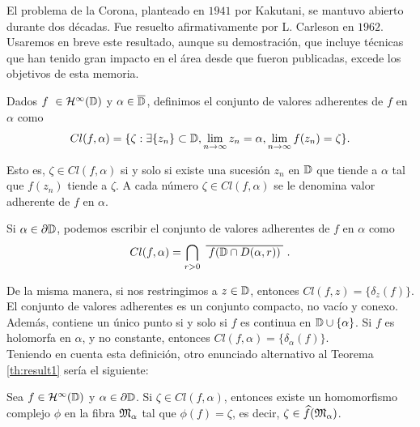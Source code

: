 \begin{obs}
    El problema de la Corona, planteado en $1941$ por Kakutani, se mantuvo abierto durante dos décadas. Fue resuelto afirmativamente por L. Carleson en $1962$. Usaremos en breve este resultado, aunque su demostración, que incluye técnicas que han tenido gran impacto en el área desde que fueron publicadas, excede los objetivos de esta memoria. \\
\end{obs}

\begin{definition}
    Dados $f \in \bholomorphic{\disk}$ y $\alpha \in \overline{\mathbb{D}}$, definimos el conjunto de valores adherentes de $f$ en $\alpha$ como
    \begin{equation*}
        Cl(f, \alpha) = \{\zeta : \exists \{z_n\} \subset \mathbb{D}, \lim_{n \to \infty} z_n = \alpha, \lim_{n \to \infty} f(z_n) = \zeta \}.
    \end{equation*}

    Esto es, $\zeta \in Cl(f, \alpha)$ si y solo si existe una sucesión $z_n$ en $\mathbb{D}$ que tiende a $\alpha$ tal que $f(z_n)$ tiende a $\zeta$. A cada número $\zeta \in Cl(f, \alpha)$ se le denomina valor adherente de $f$ en $\alpha$.
\end{definition}

\medskip

Si $\alpha \in \partial \mathbb{D}$, podemos escribir el conjunto de valores adherentes de $f$ en $\alpha$ como
\begin{equation}
    Cl(f, \alpha) = \bigcap_{r>0} \xbar{f(\disk \cap D(\alpha, r))}.
\end{equation}

De la misma manera, si nos restringimos a $z \in \mathbb{D}$, entonces $Cl(f, z) = \{\delta_z(f)\}$. \\

El conjunto de valores adherentes es un conjunto compacto, no vacío y conexo. Además, contiene un único punto si y solo si $f$ es continua en $\mathbb{D} \cup \{\alpha\}$. Si $f$ es holomorfa en $\alpha$, y no constante, entonces $Cl(f, \alpha) = \{\delta_\alpha(f)\}$. \\

Teniendo en cuenta esta definición, otro enunciado alternativo al Teorema \ref{th:result1} sería el siguiente: \\

\begin{theorem}
    Sea $f \in \bholomorphic{\disk}$ y $\alpha \in \partial \mathbb{D}$. Si $\zeta \in Cl(f, \alpha)$, entonces existe un homomorfismo complejo $\phi$ en la fibra $\mathfrak{M}_\alpha$ tal que $\phi(f) = \zeta$, es decir, $\zeta \in \widehat f (\mathfrak{M}_\alpha)$. \\
\end{theorem}

